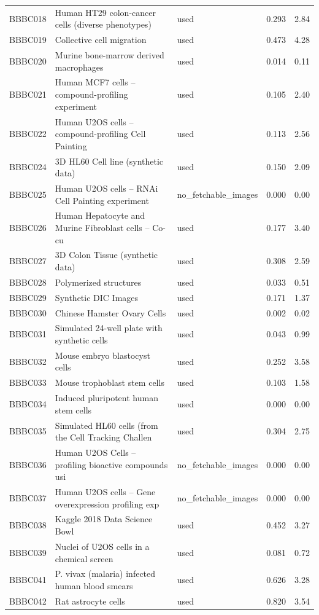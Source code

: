 \begin{longtable}{l p{6.2cm} l c c}
BBBC018 & Human HT29 colon-cancer cells (diverse phenotypes) & used & 0.293 & 2.84 \\
BBBC019 & Collective cell migration & used & 0.473 & 4.28 \\
BBBC020 & Murine bone-marrow derived macrophages & used & 0.014 & 0.11 \\
BBBC021 & Human MCF7 cells – compound-profiling experiment & used & 0.105 & 2.40 \\
BBBC022 & Human U2OS cells – compound-profiling Cell Painting  & used & 0.113 & 2.56 \\
BBBC024 & 3D HL60 Cell line (synthetic data) & used & 0.150 & 2.09 \\
BBBC025 & Human U2OS cells – RNAi Cell Painting experiment & no\_fetchable\_images & 0.000 & 0.00 \\
BBBC026 & Human Hepatocyte and Murine Fibroblast cells – Co-cu & used & 0.177 & 3.40 \\
BBBC027 & 3D Colon Tissue (synthetic data) & used & 0.308 & 2.59 \\
BBBC028 & Polymerized structures & used & 0.033 & 0.51 \\
BBBC029 & Synthetic DIC Images & used & 0.171 & 1.37 \\
BBBC030 & Chinese Hamster Ovary Cells & used & 0.002 & 0.02 \\
BBBC031 & Simulated 24-well plate with synthetic cells & used & 0.043 & 0.99 \\
BBBC032 & Mouse embryo blastocyst cells & used & 0.252 & 3.58 \\
BBBC033 & Mouse trophoblast stem cells & used & 0.103 & 1.58 \\
BBBC034 & Induced pluripotent human stem cells & used & 0.000 & 0.00 \\
BBBC035 & Simulated HL60 cells (from the Cell Tracking Challen & used & 0.304 & 2.75 \\
BBBC036 & Human U2OS Cells – profiling bioactive compounds usi & no\_fetchable\_images & 0.000 & 0.00 \\
BBBC037 & Human U2OS cells – Gene overexpression profiling exp & no\_fetchable\_images & 0.000 & 0.00 \\
BBBC038 & Kaggle 2018 Data Science Bowl & used & 0.452 & 3.27 \\
BBBC039 & Nuclei of U2OS cells in a chemical screen & used & 0.081 & 0.72 \\
BBBC041 & P. vivax (malaria) infected human blood smears & used & 0.626 & 3.28 \\
BBBC042 & Rat astrocyte cells & used & 0.820 & 3.54 \\

\end{longtable}
